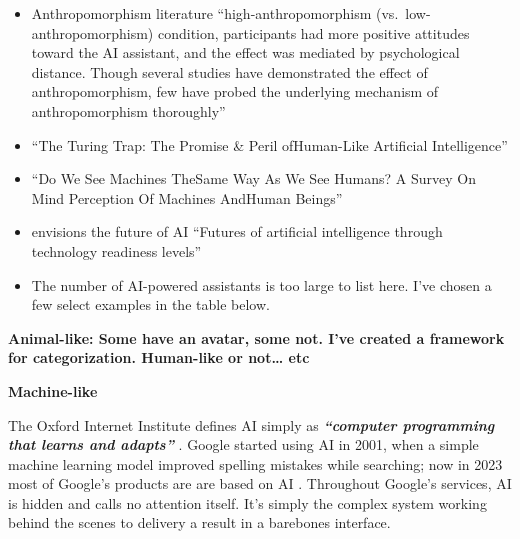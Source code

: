 \documentclass[
  letterpaper,
  DIV=11,
  numbers=noendperiod]{scrartcl}
\providecommand{\tightlist}{%
  \setlength{\itemsep}{0pt}\setlength{\parskip}{0pt}}\usepackage{longtable,booktabs,array}
\begin{document}
\begin{itemize}
\tightlist
\item
  Anthropomorphism literature \citet{liAnthropomorphismBringsUs2021}
  ``high-anthropomorphism (vs.~low-anthropomorphism) condition,
  participants had more positive attitudes toward the AI assistant, and
  the effect was mediated by psychological distance. Though several
  studies have demonstrated the effect of anthropomorphism, few have
  probed the underlying mechanism of anthropomorphism thoroughly''
\item
  \citet{erikbrynjolfssonTuringTrapPromise2022} ``The Turing Trap: The
  Promise \& Peril ofHuman-Like Artificial Intelligence''
\item
  \citet{xuWeSeeMachines2018} ``Do We See Machines TheSame Way As We See
  Humans? A Survey On Mind Perception Of Machines AndHuman Beings''
\item
  \citet{martinez-plumedFuturesArtificialIntelligence2021} envisions the
  future of AI ``Futures of artificial intelligence through technology
  readiness levels''
\item
  The number of AI-powered assistants is too large to list here. I've
  chosen a few select examples in the table below.
\end{itemize}

\textbf{Animal-like: Some have an avatar, some not. I've created a
framework for categorization. Human-like or not\ldots{} etc}

\textbf{Machine-like}

The Oxford Internet Institute defines AI simply as
\textbf{\emph{``computer programming that learns and adapts''}}
\citet{googleAZAI2022}. Google started using AI in 2001, when a simple
machine learning model improved spelling mistakes while searching; now
in 2023 most of Google's products are are based on AI
\citet{googleGooglePresentsAI2022}. Throughout Google's services, AI is
hidden and calls no attention itself. It's simply the complex system
working behind the scenes to delivery a result in a barebones interface.
\end{document}
